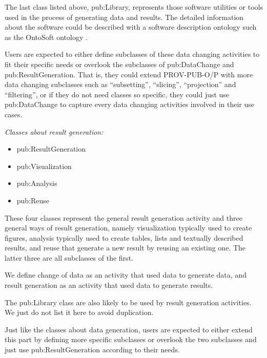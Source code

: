 The last class listed above, pub:Library, represents those software utilities or tools used in the process of generating data and results. The detailed information about the software could be described with a software description ontology such as the OntoSoft ontology \cite{gil2015ontosoft}.

Users are expected to either define subclasses of these data changing activities to fit their specific needs or overlook the subclasses of pub:DataChange and pub:ResultGeneration. That is, they could extend PROV-PUB-O/P with more data changing subclasses such as ``subsetting'', ``slicing'', ``projection'' and ``filtering'', or if they do not need classes so specific, they could just use pub:DataChange to capture every data changing activities involved in their use cases.

\noindent\emph{Classes about result generation:}
\begin{itemize}
	\item pub:ResultGeneration
	\item pub:Visualization
	\item pub:Analysis
	\item pub:Reuse
\end{itemize}
These four classes represent the general result generation activity and three general ways of result generation, namely visualization typically used to create figures, analysis typically used to create tables, lists and textually described results, and reuse that generate a new result by reusing an existing one. The latter three are all subclasses of the first.
	
We define change of data as an activity that used data to generate data, and result generation as an activity that used data to generate results.
	
The pub:Library class are also likely to be used by result generation activities. We just do not list it here to avoid duplication.
	
Just like the classes about data generation, users are expected to either extend this part by defining more specific subclasses or overlook the two subclasses and just use pub:ResultGeneration according to their needs.


